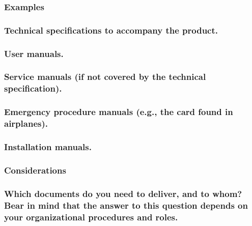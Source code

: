 \documentclass[
]{article}
\begin{document}
\hypertarget{examples-44}{%
\subsubsection{Examples}\label{examples-44}}

\hypertarget{technical-specifications-to-accompany-the-product.}{%
\subsubsection{Technical specifications to accompany the
product.}\label{technical-specifications-to-accompany-the-product.}}

\hypertarget{user-manuals.}{%
\subsubsection{User manuals.}\label{user-manuals.}}

\hypertarget{service-manuals-if-not-covered-by-the-technical-specification.}{%
\subsubsection{Service manuals (if not covered by the technical
specification).}\label{service-manuals-if-not-covered-by-the-technical-specification.}}

\hypertarget{emergency-procedure-manuals-e.g.-the-card-found-in-airplanes.}{%
\subsubsection{Emergency procedure manuals (e.g., the card found in
airplanes).}\label{emergency-procedure-manuals-e.g.-the-card-found-in-airplanes.}}

\hypertarget{installation-manuals.}{%
\subsubsection{Installation manuals.}\label{installation-manuals.}}

\hypertarget{considerations-55}{%
\subsubsection{Considerations}\label{considerations-55}}

\hypertarget{which-documents-do-you-need-to-deliver-and-to-whom-bear-in-mind-that-the-answer-to-this-question-depends-on-your-organizational-procedures-and-roles.}{%
\subsubsection{Which documents do you need to deliver, and to whom? Bear
in mind that the answer to this question depends on your organizational
procedures and
roles.}\label{which-documents-do-you-need-to-deliver-and-to-whom-bear-in-mind-that-the-answer-to-this-question-depends-on-your-organizational-procedures-and-roles.}}
\end{document}
